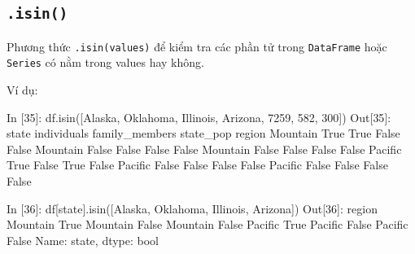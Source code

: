 \documentclass[
]{book}
\newenvironment{Shaded}{\begin{snugshade}}{\end{snugshade}}
\newcommand{\BuiltInTok}[1]{#1}
\newcommand{\DecValTok}[1]{\textcolor[rgb]{0.00,0.00,0.81}{#1}}
\newcommand{\NormalTok}[1]{#1}
\newcommand{\StringTok}[1]{\textcolor[rgb]{0.31,0.60,0.02}{#1}}
\newcommand{\VariableTok}[1]{\textcolor[rgb]{0.00,0.00,0.00}{#1}}
\begin{document}
\hypertarget{isin}{%
\subsection{\texorpdfstring{\texttt{.isin()}}{.isin()}}\label{isin}}

Phương thức \texttt{.isin(values)} để kiểm tra các phần tử trong \texttt{DataFrame} hoặc \texttt{Series} có nằm trong values hay không.

Ví dụ:

\begin{Shaded}
\begin{Highlighting}[]
\NormalTok{In [}\DecValTok{35}\NormalTok{]: df.isin([}\StringTok{\textquotesingle{}Alaska\textquotesingle{}}\NormalTok{, }\StringTok{\textquotesingle{}Oklahoma\textquotesingle{}}\NormalTok{, }\StringTok{\textquotesingle{}Illinois\textquotesingle{}}\NormalTok{, }\StringTok{\textquotesingle{}Arizona\textquotesingle{}}\NormalTok{, }\DecValTok{7259}\NormalTok{, }\DecValTok{582}\NormalTok{, }\DecValTok{300}\NormalTok{])}
\NormalTok{Out[}\DecValTok{35}\NormalTok{]:}
\NormalTok{          state  individuals  family\_members  state\_pop}
\NormalTok{region                                                 }
\NormalTok{Mountain   }\VariableTok{True}         \VariableTok{True}           \VariableTok{False}      \VariableTok{False}
\NormalTok{Mountain  }\VariableTok{False}        \VariableTok{False}           \VariableTok{False}      \VariableTok{False}
\NormalTok{Mountain  }\VariableTok{False}        \VariableTok{False}           \VariableTok{False}      \VariableTok{False}
\NormalTok{Pacific    }\VariableTok{True}        \VariableTok{False}            \VariableTok{True}      \VariableTok{False}
\NormalTok{Pacific   }\VariableTok{False}        \VariableTok{False}           \VariableTok{False}      \VariableTok{False}
\NormalTok{Pacific   }\VariableTok{False}        \VariableTok{False}           \VariableTok{False}      \VariableTok{False}

\NormalTok{In [}\DecValTok{36}\NormalTok{]: df[}\StringTok{\textquotesingle{}state\textquotesingle{}}\NormalTok{].isin([}\StringTok{\textquotesingle{}Alaska\textquotesingle{}}\NormalTok{, }\StringTok{\textquotesingle{}Oklahoma\textquotesingle{}}\NormalTok{, }\StringTok{\textquotesingle{}Illinois\textquotesingle{}}\NormalTok{, }\StringTok{\textquotesingle{}Arizona\textquotesingle{}}\NormalTok{])}
\NormalTok{Out[}\DecValTok{36}\NormalTok{]:}
\NormalTok{region}
\NormalTok{Mountain     }\VariableTok{True}
\NormalTok{Mountain    }\VariableTok{False}
\NormalTok{Mountain    }\VariableTok{False}
\NormalTok{Pacific      }\VariableTok{True}
\NormalTok{Pacific     }\VariableTok{False}
\NormalTok{Pacific     }\VariableTok{False}
\NormalTok{Name: state, dtype: }\BuiltInTok{bool}
\end{Highlighting}
\end{Shaded}
\end{document}
